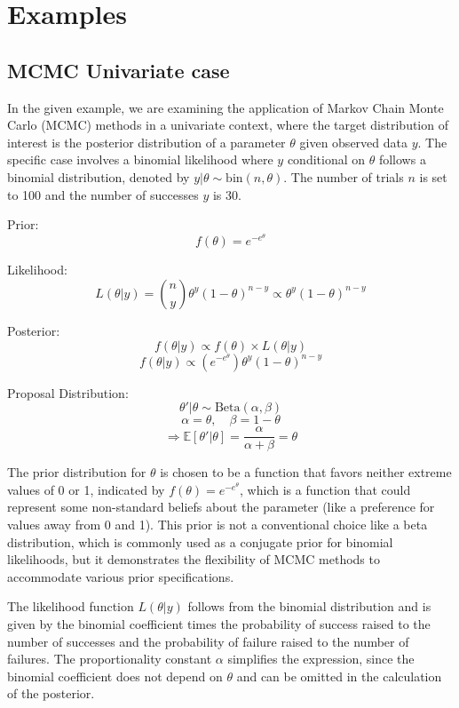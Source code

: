 \section{Examples}

\subsection*{MCMC Univariate case}

In the given example, we are examining the application of Markov Chain Monte Carlo (MCMC) methods in a univariate context, where the target distribution of interest is the posterior distribution of a parameter \( \theta \) given observed data \( y \). The specific case involves a binomial likelihood where \( y \) conditional on \( \theta \) follows a binomial distribution, denoted by \( y | \theta \sim \text{bin}(n, \theta) \). The number of trials \( n \) is set to 100 and the number of successes \( y \) is 30.

Prior:
\[ f(\theta) = e^{-e^\theta} \]

Likelihood:
\[ L(\theta | y) = \binom{n}{y} \theta^y (1 - \theta)^{n-y} \propto \theta^y (1 - \theta)^{n-y} \]

Posterior:
\[ f(\theta | y) \propto f(\theta) \times L(\theta | y) \]
\[ f(\theta | y) \propto (e^{-e^\theta}) \theta^y (1 - \theta)^{n-y} \]

Proposal Distribution:
\[ \theta' | \theta \sim \text{Beta}(\alpha, \beta) \]
\[ \alpha = \theta, \quad \beta = 1 - \theta \]
\[ \Rightarrow \mathbb{E}[\theta' | \theta] = \frac{\alpha}{\alpha + \beta} = \theta \]

The prior distribution for \( \theta \) is chosen to be a function that favors neither extreme values of 0 or 1, indicated by \( f(\theta) = e^{-e^\theta} \), which is a function that could represent some non-standard beliefs about the parameter (like a preference for values away from 0 and 1). This prior is not a conventional choice like a beta distribution, which is commonly used as a conjugate prior for binomial likelihoods, but it demonstrates the flexibility of MCMC methods to accommodate various prior specifications.

The likelihood function \( L(\theta | y) \) follows from the binomial distribution and is given by the binomial coefficient times the probability of success raised to the number of successes and the probability of failure raised to the number of failures. The proportionality constant \( \alpha \) simplifies the expression, since the binomial coefficient does not depend on \( \theta \) and can be omitted in the calculation of the posterior.

